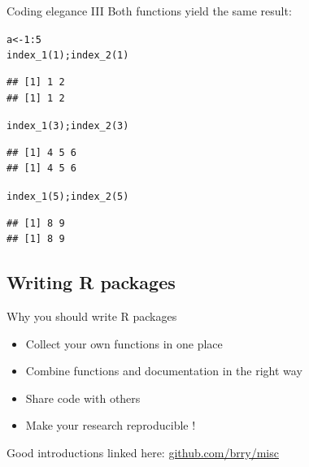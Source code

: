 \documentclass[xcolor=table,       handout,    xcolor=dvipsnames]{beamer}\usepackage[]{graphicx}\usepackage[]{color}
\makeatletter
\newcommand{\hlnum}[1]{\textcolor[rgb]{0,0,0}{#1}}
\newcommand{\hlopt}[1]{\textcolor[rgb]{0,0,0}{#1}}
\newcommand{\hlstd}[1]{\textcolor[rgb]{0,0,0}{#1}}
\newcommand{\hlkwb}[1]{\textcolor[rgb]{0,0,0}{#1}}
\newcommand{\hlkwd}[1]{\textcolor[rgb]{0,0,1}{#1}}
\newenvironment{kframe}{%
 \def\at@end@of@kframe{}%
 \ifinner\ifhmode%
  \def\at@end@of@kframe{\end{minipage}}%
  \begin{minipage}{\columnwidth}%
 \fi\fi%
 \def\FrameCommand##1{\hskip\@totalleftmargin \hskip-\fboxsep
 \colorbox{shadecolor}{##1}\hskip-\fboxsep
     \hskip-\linewidth \hskip-\@totalleftmargin \hskip\columnwidth}%
 \MakeFramed {\advance\hsize-\width
   \@totalleftmargin\z@ \linewidth\hsize
   \@setminipage}}%
 {\par\unskip\endMakeFramed%
 \at@end@of@kframe}
\newenvironment{knitrout}{}{} %
\makeatother
\begin{document}
\begin{frame}[fragile]{Coding elegance III}
Both functions yield the same result:
\begin{knitrout}\small
{}\color{fgcolor}\begin{kframe}
\begin{alltt}
\hlstd{a} \hlkwb{<-} \hlnum{1}\hlopt{:}\hlnum{5}
\hlkwd{index_1}\hlstd{(}\hlnum{1}\hlstd{);} \hlkwd{index_2}\hlstd{(}\hlnum{1}\hlstd{)}
\end{alltt}
\begin{verbatim}
## [1] 1 2
## [1] 1 2
\end{verbatim}
\begin{alltt}
\hlkwd{index_1}\hlstd{(}\hlnum{3}\hlstd{);} \hlkwd{index_2}\hlstd{(}\hlnum{3}\hlstd{)}
\end{alltt}
\begin{verbatim}
## [1] 4 5 6
## [1] 4 5 6
\end{verbatim}
\begin{alltt}
\hlkwd{index_1}\hlstd{(}\hlnum{5}\hlstd{);} \hlkwd{index_2}\hlstd{(}\hlnum{5}\hlstd{)}
\end{alltt}
\begin{verbatim}
## [1] 8 9
## [1] 8 9
\end{verbatim}
\end{kframe}
\end{knitrout}
\end{frame}


\subsection{Writing R packages}


\begin{frame}{Why you should write R packages}
\pause
\begin{itemize}[<+->]
\item Collect your own functions in one place
\item Combine functions and documentation in the right way
\item Share code with others
\item Make your research reproducible !
\end{itemize}
\onslide<+->
\vspace{1em}
Good introductions linked here:
\href{https://github.com/brry/misc\#package-development-with-rstudio-and-github}{github.com/brry/misc}
\end{frame}
\end{document}
